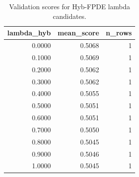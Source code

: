 \begin{table}[t]
\caption{Validation scores for Hyb-FPDE lambda candidates.}
\label{tab:lambda_distribution_computed}
\centering
\begin{tabular}{rrr}
\toprule
lambda\_hyb & mean\_score & n\_rows \\
\midrule
0.0000 & 0.5068 & 1 \\
0.1000 & 0.5069 & 1 \\
0.2000 & 0.5062 & 1 \\
0.3000 & 0.5062 & 1 \\
0.4000 & 0.5055 & 1 \\
0.5000 & 0.5051 & 1 \\
0.6000 & 0.5051 & 1 \\
0.7000 & 0.5050 & 1 \\
0.8000 & 0.5045 & 1 \\
0.9000 & 0.5046 & 1 \\
1.0000 & 0.5045 & 1 \\
\bottomrule
\end{tabular}

\end{table}
